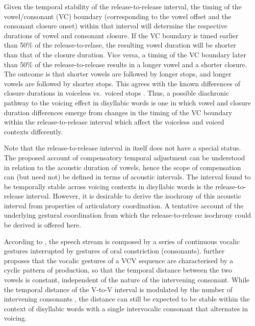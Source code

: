 \documentclass[
  12pt,
  a4paper,
]{article}
\begin{document}
Given the temporal stability of the release-to-release interval, the
timing of the vowel/consonant (VC) boundary (corresponding to the vowel
offset and the consonant closure onset) within that interval will
determine the respective durations of vowel and consonant closure. If
the VC boundary is timed earlier than 50\% of the release-to-relase, the
resulting vowel duration will be shorter than that of the closure
duration. Vice versa, a timing of the VC boundary later than 50\% of the
release-to-release results in a longer vowel and a shorter closure. The
outcome is that shorter vowels are followed by longer stops, and longer
vowels are followed by shorter stops. This agrees with the known
differences of closure durations in voiceless vs.~voiced stops
\citep{lisker1957, van-summers1987, davis1989, de-jong1991}. Thus, a
possible diachronic pathway to the voicing effect in disyllabic words is
one in which vowel and closure duration differences emerge from changes
in the timing of the VC boundary within the release-to-release interval
which affect the voiceless and voiced contexts differently.

Note that the release-to-release interval in itself does not have a
special status. The proposed account of compensatory temporal adjustment
can be understood in relation to the acoustic duration of vowels, hence
the scope of compensation can (but need not) be defined in terms of
acoustic intervals. The interval found to be temporally stable across
voicing contexts in disyllabic words is the release-to-release interval.
However, it is desirable to derive the isochrony of this acoustic
interval from properties of articulatory coordination. A tentative
account of the underlying gestural coordination from which the
release-to-release isochrony could be derived is offered here.

According to \citet{ohman1966, ohman1967}, the speech stream is composed
by a series of continuous vocalic gestures interrupted by gestures of
oral constriction (consonants). \citet{fowler1983} further proposes that
the vocalic gestures of a VCV sequence are characterised by a cyclic
pattern of production, so that the temporal distance between the two
vowels is constant, independent of the nature of the intervening
consonant. While the temporal distance of the V-to-V interval is
modulated by the number of intervening consonants
\citep{zmarich2011, zeroual2015}, the distance can still be expected to
be stable within the context of disyllabic words with a single
intervocalic consonant that alternates in voicing.
\end{document}
